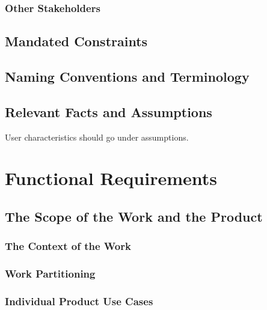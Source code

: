 \documentclass{article}
\begin{document}
\subsubsection{Other Stakeholders}

\subsection{Mandated Constraints}

\subsection{Naming Conventions and Terminology}

\subsection{Relevant Facts and Assumptions}

User characteristics should go under assumptions.

\section{Functional Requirements}

\subsection{The Scope of the Work and the Product}

\subsubsection{The Context of the Work}

\subsubsection{Work Partitioning}

\subsubsection{Individual Product Use Cases}
\end{document}
